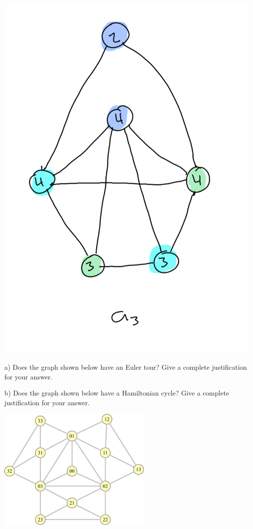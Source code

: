 \documentclass{article}
\begin{document}
\begin{solution}
	\\ \includegraphics[scale=0.3]{a3.png}


	
\end{solution}

\vspace{0.15in}
\newpage
\begin{problem}

a) Does the graph shown below have an Euler tour? Give a complete justification for your answer.

b) Does the graph shown below have a Hamiltonian cycle? Give a complete justification for your answer.


	\begin{center}
	\includegraphics[width = 3in]{Ham_graph.pdf}
	\end{center}

\end{problem}
\end{document}
